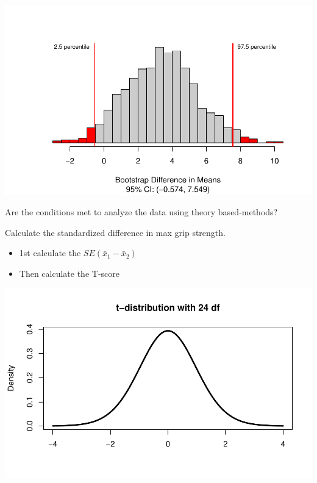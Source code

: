 \documentclass[
]{report}
\providecommand{\tightlist}{%
  \setlength{\itemsep}{0pt}\setlength{\parskip}{0pt}}
\begin{document}
\begin{center}\includegraphics[width=0.7\linewidth]{12-LN012-1ofeach_files/figure-latex/unnamed-chunk-5-1} \end{center}

Are the conditions met to analyze the data using theory based-methods?

\vspace{1in}

Calculate the standardized difference in max grip strength.

\begin{itemize}
\tightlist
\item
  1st calculate the \(SE(\bar{x}_1 - \bar{x}_2)\)
\end{itemize}

\vspace{0.6in}

\begin{itemize}
\tightlist
\item
  Then calculate the T-score
\end{itemize}

\vspace{1in}

\begin{center}\includegraphics[width=0.7\linewidth]{12-LN012-1ofeach_files/figure-latex/pvaluepb-1} \end{center}
\end{document}
